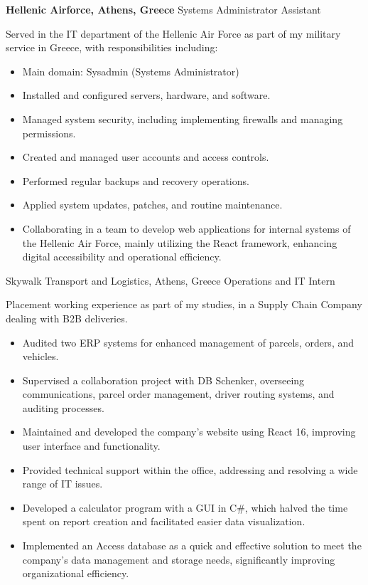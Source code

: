 {\textbf{Hellenic Airforce, Athens, Greece}}
{Systems Administrator Assistant}
{
    Served in the IT department of the Hellenic Air Force as part of my military service in Greece, with
    responsibilities including:
    \begin{itemize}
        \item Main domain: Sysadmin (Systems Administrator)
        \item Installed and configured servers, hardware, and software.
        \item Managed system security, including implementing firewalls and managing permissions.
        \item Created and managed user accounts and access controls.
        \item Performed regular backups and recovery operations.
        \item Applied system updates, patches, and routine maintenance.
        \item Collaborating in a team to develop web applications for internal systems of the Hellenic Air Force, mainly utilizing
              the React framework, enhancing digital accessibility and operational efficiency.
    \end{itemize}
}

{Skywalk Transport and Logistics, Athens, Greece }
{Operations and IT Intern}
{

    Placement working experience as part of my studies, in a Supply Chain Company dealing with B2B deliveries.
    \begin{itemize}
        \item Audited two ERP systems for enhanced management of parcels, orders, and vehicles.
        \item Supervised a collaboration project with DB Schenker, overseeing communications, parcel order management, driver routing systems, and auditing processes.
        \item Maintained and developed the company's website using React 16, improving user interface and functionality.
        \item Provided technical support within the office, addressing and resolving a wide range of IT issues.
        \item Developed a calculator program with a GUI in C\#, which halved the time spent on report creation and facilitated easier data visualization.
        \item Implemented an Access database as a quick and effective solution to meet the company's data management and storage needs, significantly improving organizational efficiency.

    \end{itemize}
}

